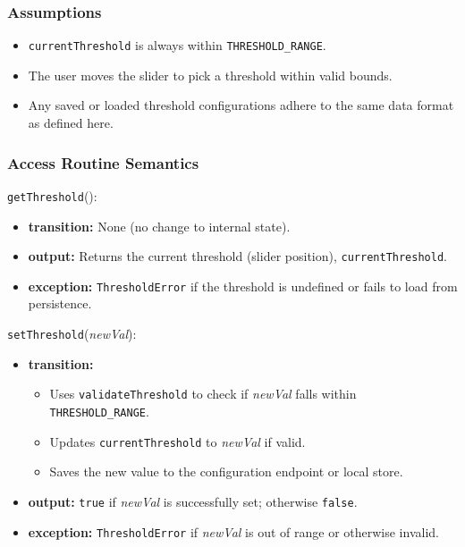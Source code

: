 \documentclass[12pt, titlepage]{article}
\begin{document}
\subsubsection{Assumptions}

\begin{itemize}
    \item \texttt{currentThreshold} is always within \texttt{THRESHOLD\_RANGE}.
    \item The user moves the slider to pick a threshold within valid bounds.
    \item Any saved or loaded threshold configurations adhere to the same data format as defined here.
\end{itemize}

\subsubsection{Access Routine Semantics}

\noindent \texttt{getThreshold}():
\begin{itemize}
    \item \textbf{transition:} None (no change to internal state).
    \item \textbf{output:} Returns the current threshold (slider position), \texttt{currentThreshold}.
    \item \textbf{exception:} \texttt{ThresholdError} if the threshold is undefined or fails to load from persistence.
\end{itemize}

\noindent \texttt{setThreshold}(\textit{newVal}):
\begin{itemize}
    \item \textbf{transition:}
    \begin{itemize}
        \item Uses \texttt{validateThreshold} to check if \textit{newVal} falls within \texttt{THRESHOLD\_RANGE}.
        \item Updates \texttt{currentThreshold} to \textit{newVal} if valid.
        \item Saves the new value to the configuration endpoint or local store.
    \end{itemize}
    \item \textbf{output:} \texttt{true} if \textit{newVal} is successfully set; otherwise \texttt{false}.
    \item \textbf{exception:} \texttt{ThresholdError} if \textit{newVal} is out of range or otherwise invalid.
\end{itemize}
\end{document}

